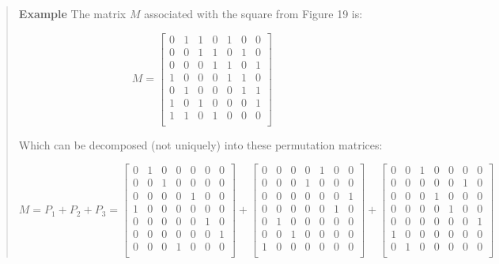 \documentclass[
  11pt,
  a4paper]{book}
\newcounter{examplecounter}
\begin{document}
\begin{quote}  \textbf{Example } \quad 
The matrix $M$ associated with the square from Figure 19 is:

\begin{equation}
 M = \begin{bmatrix}
    0 & 1 & 1 & 0 & 1 & 0 & 0 \\
    0 & 0 & 1 & 1 & 0 & 1 & 0 \\
    0 & 0 & 0 & 1 & 1 & 0 & 1 \\
    1 & 0 & 0 & 0 & 1 & 1 & 0 \\
    0 & 1 & 0 & 0 & 0 & 1 & 1 \\
    1 & 0 & 1 & 0 & 0 & 0 & 1 \\
    1 & 1 & 0 & 1 & 0 & 0 & 0 \\
  \end{bmatrix}
\end{equation}

Which can be decomposed (not uniquely) into these
permutation matrices:

\begin{equation}
 M = P_1 + P_2 + P_3 = 
  \begin{bmatrix}
    0 & 1 & 0 & 0 & 0 & 0 & 0 \\
    0 & 0 & 1 & 0 & 0 & 0 & 0 \\
    0 & 0 & 0 & 0 & 1 & 0 & 0 \\
    1 & 0 & 0 & 0 & 0 & 0 & 0 \\
    0 & 0 & 0 & 0 & 0 & 1 & 0 \\
    0 & 0 & 0 & 0 & 0 & 0 & 1 \\
    0 & 0 & 0 & 1 & 0 & 0 & 0 \\
  \end{bmatrix}
  +
  \begin{bmatrix}
    0 & 0 & 0 & 0 & 1 & 0 & 0 \\
    0 & 0 & 0 & 1 & 0 & 0 & 0 \\
    0 & 0 & 0 & 0 & 0 & 0 & 1 \\
    0 & 0 & 0 & 0 & 0 & 1 & 0 \\
    0 & 1 & 0 & 0 & 0 & 0 & 0 \\
    0 & 0 & 1 & 0 & 0 & 0 & 0 \\
    1 & 0 & 0 & 0 & 0 & 0 & 0 \\
  \end{bmatrix}
  +
  \begin{bmatrix}
    0 & 0 & 1 & 0 & 0 & 0 & 0 \\
    0 & 0 & 0 & 0 & 0 & 1 & 0 \\
    0 & 0 & 0 & 1 & 0 & 0 & 0 \\
    0 & 0 & 0 & 0 & 1 & 0 & 0 \\
    0 & 0 & 0 & 0 & 0 & 0 & 1 \\
    1 & 0 & 0 & 0 & 0 & 0 & 0 \\
    0 & 1 & 0 & 0 & 0 & 0 & 0 \\
  \end{bmatrix}
\end{equation}


\end{quote}
\end{document}
